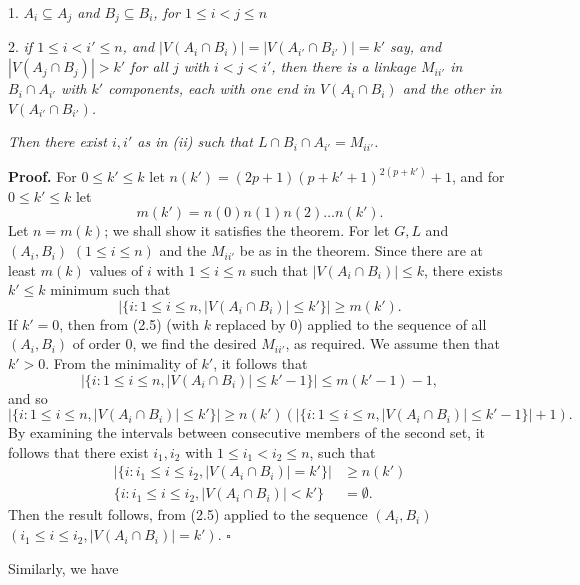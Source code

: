\hspace*{12pt}1. \textit{$A_i \subseteq A_j$ and $B_j \subseteq B_i$, for $1 \le i < j \le n$}

\hspace*{12pt}2. \textit{if $1 \le i < i' \le n$, and $|V(A_i \cap B_i)| = |V(A_{i'} \cap B_{i'})| = k'$ say, and $|V(A_j \cap B_j)| > k'$ for all $j$ with $i < j < i'$, then there is a linkage $M_{ii'}$ in $B_i \cap A_{i'}$ with $k'$ components, each with one end in $V(A_i \cap B_i)$ and the other in $V(A_{i'} \cap B_{i'})$.}

\textit{Then there exist $i, i'$ as in (ii) such that $L \cap B_i \cap A_{i'} = M_{ii'}$.}

\textbf{Proof.} For $0 \le k' \le k$ let $n(k') = (2p + 1)(p + k' + 1)^{2(p+k')} + 1$, and for $0 \le k' \le k$ let
\begin{equation*}
m(k') = n(0)n(1)n(2)\dots n(k').
\end{equation*}
Let $n = m(k)$; we shall show it satisfies the theorem. For let $G, L$ and $(A_i, B_i)$ $(1 \le i \le n)$ and the $M_{ii'}$ be as in the theorem. Since there are at least $m(k)$ values of $i$ with $1 \le i \le n$ such that $|V(A_i \cap B_i)| \le k$, there exists $k' \le k$ minimum such that
\begin{equation*}
|\{i : 1 \le i \le n, |V(A_i \cap B_i)| \le k'\}| \ge m(k').
\end{equation*}
If $k' = 0$, then from (2.5) (with $k$ replaced by $0$) applied to the sequence of all $(A_i, B_i)$ of order $0$, we find the desired $M_{ii'}$, as required. We assume then that $k' > 0$. From the minimality of $k'$, it follows that
\begin{equation*}
|\{i : 1 \le i \le n, |V(A_i \cap B_i)| \le k' - 1\}| \le m(k' - 1) - 1,
\end{equation*}
and so
\begin{equation*}
|\{i : 1 \le i \le n, |V(A_i \cap B_i)| \le k'\}| \ge n(k')(|\{i : 1 \le i \le n, |V(A_i \cap B_i)| \le k' - 1\}| + 1).
\end{equation*}
By examining the intervals between consecutive members of the second set, it follows that there exist $i_1, i_2$ with $1 \le i_1 < i_2 \le n$, such that
\begin{align*}
|\{i : i_1 \le i \le i_2, |V(A_i \cap B_i)| = k'\}| &\ge n(k') \\
\{i : i_1 \le i \le i_2, |V(A_i \cap B_i)| < k'\} &= \emptyset.
\end{align*}
Then the result follows, from (2.5) applied to the sequence $(A_i, B_i)$ $(i_1 \le i \le i_2, |V(A_i \cap B_i)| = k')$. $\square$

Similarly, we have
